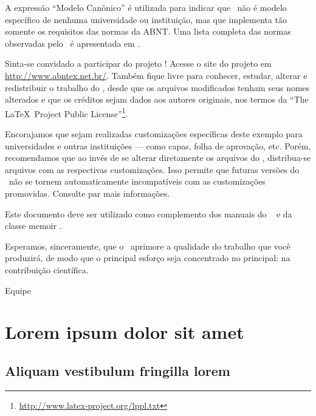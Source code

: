 \documentclass[
	12pt,				%
	openright,			%
	a4paper,			%
	fleqn, %
	english,			%
	french,				%
	spanish,			%
	brazil,				%
	]{abntex2}
\begin{document}
A expressão ``Modelo Canônico'' é utilizada para indicar que \abnTeX\ não é
modelo específico de nenhuma universidade ou instituição, mas que implementa tão
somente os requisitos das normas da ABNT. Uma lista completa das normas
observadas pelo \abnTeX\ é apresentada em .

Sinta-se convidado a participar do projeto \abnTeX! Acesse o site do projeto em
\url{http://www.abntex.net.br/}. Também fique livre para conhecer,
estudar, alterar e redistribuir o trabalho do \abnTeX, desde que os arquivos
modificados tenham seus nomes alterados e que os créditos sejam dados aos
autores originais, nos termos da ``The \LaTeX\ Project Public
License''\footnote{\url{http://www.latex-project.org/lppl.txt}}.

Encorajamos que sejam realizadas customizações específicas deste exemplo para
universidades e outras instituições --- como capas, folha de aprovação, etc.
Porém, recomendamos que ao invés de se alterar diretamente os arquivos do
\abnTeX, distribua-se arquivos com as respectivas customizações.
Isso permite que futuras versões do \abnTeX~não se tornem automaticamente
incompatíveis com as customizações promovidas. Consulte
 par mais informações.

Este documento deve ser utilizado como complemento dos manuais do \abnTeX\ 
\cite{abntex2classe,abntex2cite,abntex2cite-alf} e da classe \textsf{memoir}
\cite{memoir}. 

Esperamos, sinceramente, que o \abnTeX\ aprimore a qualidade do trabalho que
você produzirá, de modo que o principal esforço seja concentrado no principal:
na contribuição científica.

Equipe \abnTeX 





\chapter{Lorem ipsum dolor sit amet}

\section{Aliquam vestibulum fringilla lorem}

\lipsum[1]
\end{document}

